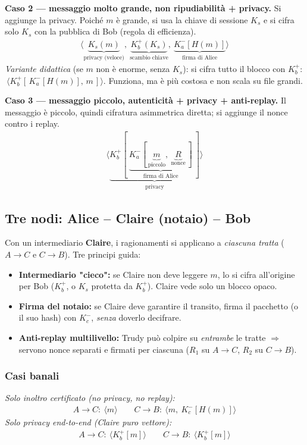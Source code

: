 \documentclass[11pt,a4paper]{report}
\begin{document}
\medskip
\noindent\textbf{Caso 2 --- messaggio molto grande, non ripudiabilità + privacy.}
Si aggiunge la privacy. Poiché $m$ è grande, si usa la chiave di sessione $K_s$ e
si cifra solo $K_s$ con la pubblica di Bob (regola di efficienza).
\begin{align*}
  \langle \underbrace{K_s(m)}_\text{privacy (veloce)},\ \underbrace{K_b^+(K_s)}_\text{scambio chiave},\ \underbrace{K_a^-[H(m)]}_\text{firma di Alice} \rangle
\end{align*}
\emph{Variante didattica} (se $m$ non è enorme, senza $K_s$): si cifra tutto il
blocco con $K_b^+$: $\ \langle K_b^+[\,K_a^-[H(m)],\, m\,]\rangle$. Funziona, ma è
più costosa e non scala su file grandi.

\medskip
\noindent\textbf{Caso 3 --- messaggio piccolo, autenticità + privacy + anti-replay.}
Il messaggio è piccolo, quindi cifratura asimmetrica diretta; si aggiunge il nonce
contro i replay.
\begin{align*}
  \langle \underbrace{K_b^+[\ \underbrace{K_a^-[\,\underbrace{m}_\text{piccolo},\ \underbrace{R}_\text{nonce}\,]}_\text{firma di Alice}\ ]}_\text{privacy} \rangle
\end{align*}

\subsection{Tre nodi: Alice -- Claire (notaio) -- Bob}

Con un intermediario \textbf{Claire}, i ragionamenti si applicano a \emph{ciascuna
tratta} ($A\to C$ e $C\to B$). Tre principi guida:

\begin{itemize}
\item \textbf{Intermediario "cieco":} se Claire non deve leggere $m$, lo si cifra
all'origine per Bob ($K_b^+$, o $K_s$ protetta da $K_b^+$). Claire vede solo un
blocco opaco.
\item \textbf{Firma del notaio:} se Claire deve garantire il transito, firma il
pacchetto (o il suo hash) con $K_c^-$, \emph{senza} doverlo decifrare.
\item \textbf{Anti-replay multilivello:} Trudy può colpire su \emph{entrambe} le
tratte $\Rightarrow$ servono nonce separati e firmati per ciascuna ($R_1$ su
$A\to C$, $R_2$ su $C\to B$).
\end{itemize}

\subsubsection*{Casi banali}
\noindent\textit{Solo inoltro certificato (no privacy, no replay):}
\begin{align*}
  A \to C:\ \langle m \rangle \qquad
  C \to B:\ \langle m,\ K_c^-[H(m)] \rangle
\end{align*}
\noindent\textit{Solo privacy end-to-end (Claire puro vettore):}
\begin{align*}
  A \to C:\ \langle K_b^+[m] \rangle \qquad
  C \to B:\ \langle K_b^+[m] \rangle
\end{align*}
\end{document}
